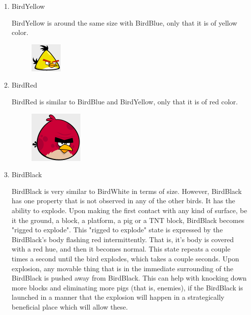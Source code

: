 \documentclass{dalthesis}
\begin{document}
\begin{enumerate}
\begin{enumerate}
\begin{enumerate}
      \item BirdYellow

      BirdYellow is around the same size with BirdBlue, only that it is of yellow color.

      \begin{figure}[H]
        \includegraphics[width=.5\textwidth,keepaspectratio]{birds/yellow.png}
      \end{figure}

      \item BirdRed

      BirdRed is similar to BirdBlue and BirdYellow, only that it is of red color.

      \begin{figure}[H]
        \includegraphics[width=.5\textwidth,keepaspectratio]{birds/red.png}
      \end{figure}

      \item BirdBlack

      BirdBlack is very similar to BirdWhite in terms of size. However, BirdBlack has one property that is not observed in any of the other birds. It has the ability to explode. Upon making the first contact with any kind of surface, be it the ground, a block, a platform, a pig or a TNT block, BirdBlack becomes "rigged to explode". This "rigged to explode" state is expressed by the BirdBlack's body flashing red intermittently. That is, it's body is covered with a red hue, and then it becomes normal. This state repeats a couple times a second until the bird explodes, which takes a couple seconds. Upon explosion, any movable thing that is in the immediate surrounding of the BirdBlack is pushed away from BirdBlack. This can help with knocking down more blocks and eliminating more pigs (that is, enemies), if the BirdBlack is launched in a manner that the explosion will happen in a strategically beneficial place which will allow these.


\end{enumerate}
\end{enumerate}
\end{enumerate}
\end{document}
